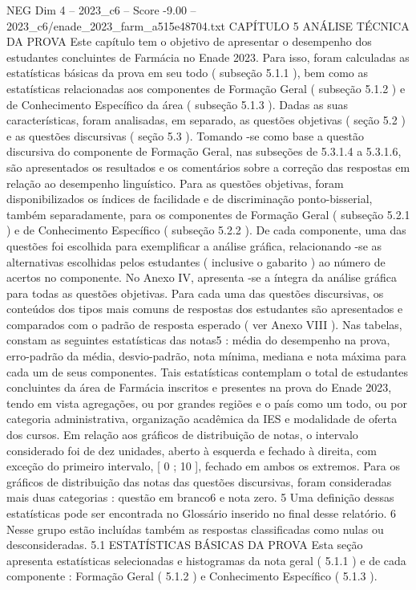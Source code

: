 \begin{textsample}{NEG Dim 4 – 2023\_c6 – Score -9.00 – 2023\_c6/enade\_2023\_farm\_a515e48704.txt}  \label{ex:f4_neg_015}
CAPÍTULO 5 ANÁLISE TÉCNICA DA PROVA Este capítulo tem o objetivo de apresentar o desempenho dos estudantes concluintes de Farmácia no Enade 2023.
Para isso, foram calculadas as estatísticas básicas da prova em seu todo ( subseção 5.1.1 ), bem como as estatísticas relacionadas aos componentes de Formação Geral ( subseção 5.1.2 ) e de Conhecimento Específico da área ( subseção 5.1.3 ).
Dadas as suas características, foram analisadas, em separado, as questões objetivas ( seção 5.2 ) e as questões discursivas ( seção 5.3 ).
Tomando -se como base a questão discursiva do componente de Formação Geral, nas subseções de 5.3.1.4 a 5.3.1.6, são apresentados os resultados e os comentários sobre a correção das respostas em relação ao desempenho linguístico.
Para as questões objetivas, foram disponibilizados os índices de facilidade e de discriminação ponto-bisserial, também separadamente, para os componentes de Formação Geral ( subseção 5.2.1 ) e de Conhecimento Específico ( subseção 5.2.2 ).
De cada componente, uma das questões foi escolhida para exemplificar a análise gráfica, relacionando -se as alternativas escolhidas pelos estudantes ( inclusive o gabarito ) ao número de acertos no componente.
No Anexo IV, apresenta -se a íntegra da análise gráfica para todas as questões objetivas.
Para cada uma das questões discursivas, os conteúdos dos tipos mais comuns de respostas dos estudantes são apresentados e comparados com o padrão de resposta esperado ( ver Anexo VIII ).
Nas tabelas, constam as seguintes estatísticas das notas5 : média do desempenho na prova, erro-padrão da média, desvio-padrão, nota mínima, mediana e nota máxima para cada um de seus componentes.
Tais estatísticas contemplam o total de estudantes concluintes da área de Farmácia inscritos e presentes na prova do Enade 2023, tendo em vista agregações, ou por grandes regiões e o país como um todo, ou por categoria administrativa, organização acadêmica da IES e modalidade de oferta dos cursos.
Em relação aos gráficos de distribuição de notas, o intervalo considerado foi de dez unidades, aberto à esquerda e fechado à direita, com exceção do primeiro intervalo, [ 0 ; 10 ], fechado em ambos os extremos.
Para os gráficos de distribuição das notas das questões discursivas, foram consideradas mais duas categorias : questão em branco6 e nota zero. 5 Uma definição dessas estatísticas pode ser encontrada no Glossário inserido no final desse relatório. 6 Nesse grupo estão incluídas também as respostas classificadas como nulas ou desconsideradas. 5.1 ESTATÍSTICAS BÁSICAS DA PROVA Esta seção apresenta estatísticas selecionadas e histogramas da nota geral ( 5.1.1 ) e de cada componente : Formação Geral ( 5.1.2 ) e Conhecimento Específico ( 5.1.3 ).

\end{textsample}
